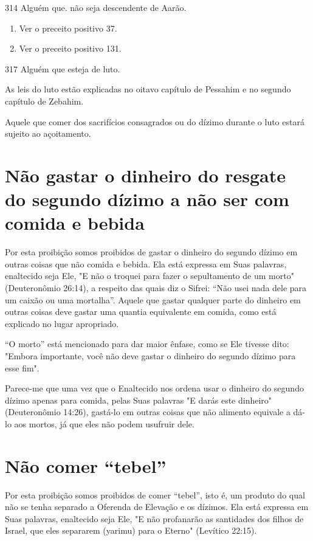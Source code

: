 314 Alguém que. não seja descendente de Aarão.


\begin{enumerate}
\def\labelenumi{\arabic{enumi}.}
\setcounter{enumi}{314}
\item
 
 Ver o preceito positivo 37.
 
\item
 
 Ver o preceito positivo 131.
 
\end{enumerate}


317 Alguém que esteja de luto.

As leis do luto estão explicadas no oitavo capítulo de Pessahim e no
segundo capítulo de Zebahim.

Aquele que comer dos sacrifícios consagrados ou do dízimo duran­te o
luto estará sujeito ao açoitamento.

\section{Não gastar o dinheiro do resgate do segundo dízimo a não ser com comida e bebida}

Por esta proibição somos proibidos de gastar o dinheiro do segun­do
dízimo em outras coisas que não comida e bebida. Ela está expressa em
Suas palavras, enaltecido seja Ele, "E não o troquei para fazer o
sepultamento de um morto" (Deuteronômio 26:14), a respeito das quais diz
o Sifrei: ``Não usei nada dele para um caixão ou uma mortalha''. Aquele
que gastar qualquer parte do dinheiro em outras coisas deve gastar uma
quantia equivalente em comida, co­mo está explicado no lugar apropriado.

``O morto'' está mencionado para dar maior ênfase, como se Ele ti­vesse
dito: "Embora importante, você não deve gastar o dinheiro do segundo
dízimo para esse fim".

Parece-me que uma vez que o Enaltecido nos ordena usar o dinhei­ro do
segundo dízimo apenas para comida, pelas Suas palavras "E darás este
dinheiro" (Deuteronômio 14:26), gastá-lo em outras coisas que não
alimento equivale a dá-lo aos mortos, já que eles não podem usufruir
dele.

\section{Não comer ``tebel''}

Por esta proibição somos proibidos de comer ``tebel'', isto é, um pro­duto
do qual não se tenha separado a Oferenda de Elevação e os dízimos. Ela
está expressa em Suas palavras, enaltecido seja Ele, "E não profanarão
as santi­dades dos filhos de Israel, que eles separarem (yarimu) para o
Eterno" (Levítico 22:15).


